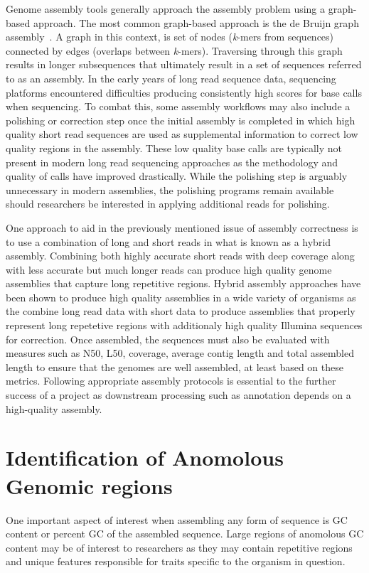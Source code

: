 Genome assembly tools generally approach the assembly problem using a
graph-based approach. The most common graph-based approach is the de
Bruijn graph assembly~\cite{Compeau2011}. A graph in this context, is
set of nodes (\textit{k}-mers from sequences) connected by edges
(overlaps between \textit{k}-mers). Traversing through this graph
results in longer subsequences that ultimately result in a set of
sequences referred to as an assembly. In the early years of long read
sequence data, sequencing platforms encountered difficulties producing
consistently high scores for base calls when sequencing. To combat
this, some assembly workflows may also include a polishing or
correction step once the initial assembly is completed in which high
quality short read sequences are used as supplemental information to
correct low quality regions in the assembly. These low quality base
calls are typically not present in modern long read sequencing
approaches as the methodology and quality of calls have improved
drastically. While the polishing step is arguably unnecessary in
modern assemblies, the polishing programs remain available should
researchers be interested in applying additional reads for polishing.

One approach to aid in the previously mentioned issue of assembly
correctness is to use a combination of long and short reads in what is
known as a hybrid assembly. Combining both highly accurate short reads
with deep coverage along with less accurate but much longer reads can
produce high quality genome assemblies that capture long repetitive
regions. Hybrid assembly approaches have been shown to produce high
quality assemblies in a wide variety of organisms as the combine long
read data with short data to produce assemblies that properly
represent long repetetive regions with additionaly high quality
Illumina sequences for correction. Once assembled, the sequences must
also be evaluated with measures such as N50, L50, coverage, average
contig length and total assembled length to ensure that the genomes
are well assembled, at least based on these
metrics\cite{Nagarajan2013}. Following appropriate assembly protocols
is essential to the further success of a project as downstream
processing such as annotation depends on a high-quality assembly.

\section{Identification of Anomolous Genomic regions}
One important aspect of interest when assembling any form of sequence
is GC content or percent GC of the assembled sequence. Large regions
of anomolous GC content may be of interest to researchers as they may
contain repetitive regions and unique features responsible for traits
specific to the organism in question.

